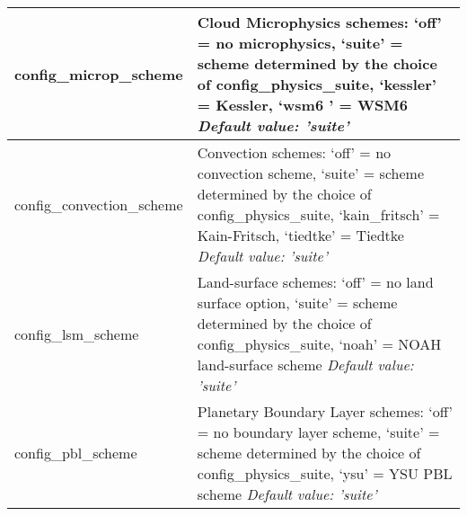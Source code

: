 {\begin{longtable}{|p{2.0in} |p{4.25in}|}
  config\_microp\_scheme & Cloud Microphysics schemes: \newline
                                             `off'  = no microphysics, \newline
                                             `suite'  = scheme determined by the choice of config\_physics\_suite, \newline
                                             `kessler' = Kessler, \newline 
                                             `wsm6       ' = WSM6 \newline
  {\em Default value: 'suite'} \\ \hline

  config\_convection\_scheme & Convection schemes: \newline
                                             `off' = no convection scheme, \newline
                                             `suite'  = scheme determined by the choice of config\_physics\_suite, \newline
                                             `kain\_fritsch' = Kain-Fritsch, \newline 
                                             `tiedtke' = Tiedtke \newline
  {\em Default value: 'suite'} \\ \hline

  config\_lsm\_scheme & Land-surface schemes: \newline
                                             `off' = no land surface option, \newline
                                             `suite'  = scheme determined by the choice of config\_physics\_suite, \newline
                                             `noah' = NOAH land-surface scheme \newline                                              
  {\em Default value: 'suite'} \\ \hline

  config\_pbl\_scheme & Planetary Boundary Layer schemes: \newline
                                             `off' = no boundary layer scheme, \newline
                                             `suite'  = scheme determined by the choice of config\_physics\_suite, \newline
                                             `ysu' = YSU PBL scheme \newline 
  {\em Default value: 'suite'} \\ \hline


\end{longtable}}
